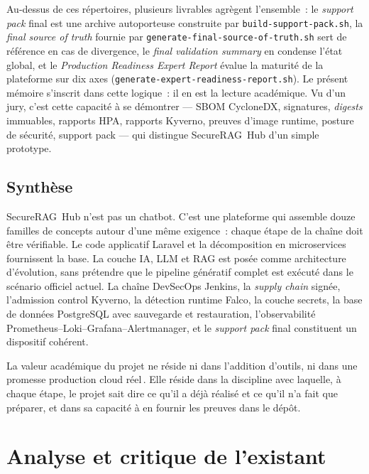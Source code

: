 Au-dessus de ces répertoires, plusieurs livrables agrègent l'ensemble~:
le \emph{support pack} final est une archive autoporteuse construite par
\texttt{build-support-pack.sh}, la \emph{final source of truth} fournie
par \texttt{generate-final-source-of-truth.sh} sert de référence en cas
de divergence, le \emph{final validation summary} en condense l'état
global, et le \emph{Production Readiness Expert Report} évalue la
maturité de la plateforme sur dix axes (\texttt{generate-expert-readiness-report.sh}).
Le présent mémoire s'inscrit dans cette logique~: il en est la lecture
académique. Vu d'un jury, c'est cette capacité à se démontrer ---
SBOM CycloneDX, signatures, \emph{digests} immuables, rapports HPA,
rapports Kyverno, preuves d'image runtime, posture de sécurité, support
pack --- qui distingue SecureRAG~Hub d'un simple prototype.

\subsection{Synthèse}
\label{subsec:concepts-synthese}

SecureRAG~Hub n'est pas un chatbot. C'est une plateforme qui assemble
douze familles de concepts autour d'une même exigence~: chaque étape de
la chaîne doit être vérifiable. Le code applicatif Laravel et la
décomposition en microservices fournissent la base. La couche IA,
LLM et RAG est posée comme architecture d'évolution, sans prétendre
que le pipeline génératif complet est exécuté dans le scénario officiel
actuel. La chaîne DevSecOps Jenkins, la \emph{supply chain} signée,
l'admission control Kyverno, la détection runtime Falco, la couche
secrets, la base de données PostgreSQL avec sauvegarde et restauration,
l'observabilité Prometheus--Loki--Grafana--Alertmanager, et le
\emph{support pack} final constituent un dispositif cohérent.

La valeur académique du projet ne réside ni dans l'addition d'outils, ni
dans une promesse \og production cloud réel\,\fg{}. Elle réside dans la
discipline avec laquelle, à chaque étape, le projet sait dire ce qu'il a
déjà réalisé et ce qu'il n'a fait que préparer, et dans sa capacité à en
fournir les preuves dans le dépôt.

\section{Analyse et critique de l’existant}


